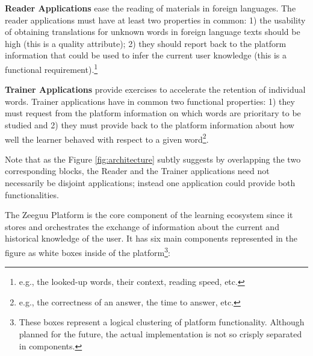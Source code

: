 \begin{description}
	
	\item {\bf Reader Applications} ease the reading of materials in foreign languages. The reader applications must have at least two properties in common: 
		1) the usability of obtaining translations for unknown words in foreign language texts should be high (this is a quality attribute); 
		2) they should report back to the platform information that could be used to infer the current user knowledge (this is a functional requirement).\footnote{e.g., the looked-up words, their context, reading speed, etc.} 

	\item {\bf Trainer Applications} provide exercises to accelerate the retention of individual words. Trainer applications have in common two functional properties: 
		1) they must request from the platform information on which words are prioritary to be studied and 
		2) they must provide back to the platform information about how well the learner behaved with respect to a given word\footnote{e.g., the correctness of an answer, the time to answer, etc.}.

\end{description}

Note that as the Figure \ref{fig:architecture} subtly suggests by overlapping the two corresponding blocks, the Reader and the Trainer applications need not necessarily be disjoint applications; instead one application could provide both functionalities.


The Zeeguu Platform is the core component of the learning ecosystem since it stores and orchestrates the exchange of information about the current and historical knowledge of the user. It has six main components represented in the figure as white boxes inside of the platform\footnote{These boxes represent a logical clustering of platform functionality. Although planned for the future, the actual implementation is not so crisply separated in components.}: 

